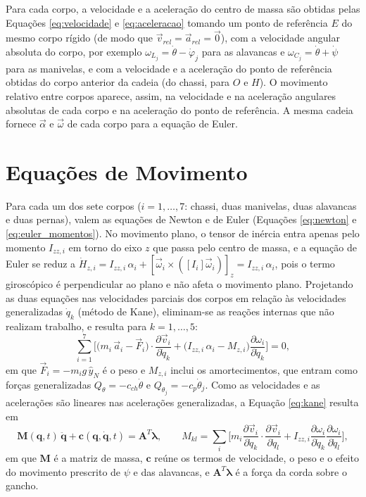 Para cada corpo, a velocidade e a aceleração do centro de massa são obtidas pelas Equações \ref{eq:velocidade} e \ref{eq:aceleracao} tomando um ponto de referência $E$ do mesmo corpo rígido (de modo que $\vec v_{rel}=\vec a_{rel}=\vec 0$), com a velocidade angular absoluta do corpo, por exemplo $\omega_{L_j}=\dot\theta-\dot\varphi_j$ para as alavancas e $\omega_{C_j}=\dot\theta+\dot\psi$ para as manivelas, e com a velocidade e a aceleração do ponto de referência obtidas do corpo anterior da cadeia (do chassi, para $O$ e $H$). O movimento relativo entre corpos aparece, assim, na velocidade e na aceleração angulares absolutas de cada corpo e na aceleração do ponto de referência. A mesma cadeia fornece $\vec\alpha$ e $\vec\omega$ de cada corpo para a equação de Euler.

\section{Equações de Movimento}
\label{sec:eqmov}

Para cada um dos sete corpos ($i=1,\dots,7$: chassi, duas manivelas, duas alavancas e duas pernas), valem as equações de Newton e de Euler (Equações \ref{eq:newton} e \ref{eq:euler_momentos}). No movimento plano, o tensor de inércia entra apenas pelo momento $I_{zz,i}$ em torno do eixo $z$ que passa pelo centro de massa, e a equação de Euler se reduz a $\dot{H}_{z,i}=I_{zz,i}\,\alpha_{i}+\left[\vec\omega_i\times(\left[I_i\right]\vec\omega_i)\right]_z = I_{zz,i}\,\alpha_i$, pois o termo giroscópico é perpendicular ao plano e não afeta o movimento plano. Projetando as duas equações nas velocidades parciais dos corpos em relação às velocidades generalizadas $\dot q_k$ (método de Kane), eliminam-se as reações internas que não realizam trabalho, e resulta para $k=1,\dots,5$:
\begin{equation}
  \sum_{i=1}^{7}\Big[\big(m_i\,\vec a_i-\vec F_i\big)\cdot\frac{\partial\vec v_i}{\partial\dot q_k}
  +\big(I_{zz,i}\,\alpha_i-M_{z,i}\big)\frac{\partial\omega_i}{\partial\dot q_k}\Big]=0,
  \label{eq:kane}
\end{equation}
em que $\vec F_i = -m_i g\,\hat y_N$ é o peso e $M_{z,i}$ inclui os amortecimentos, que entram como forças generalizadas $Q_\theta=-c_{ch}\dot\theta$ e $Q_{\theta_j}=-c_{p}\dot\theta_j$. Como as velocidades e as acelerações são lineares nas acelerações generalizadas, a Equação \ref{eq:kane} resulta em
\begin{equation}
  \mathbf{M}(\mathbf{q},t)\,\ddot{\mathbf{q}} + \mathbf{c}(\mathbf{q},\dot{\mathbf{q}},t) = \mathbf{A}^{T}\boldsymbol{\lambda},
  \qquad
  M_{kl}=\sum_i\Big[m_i\frac{\partial\vec v_i}{\partial\dot q_k}\cdot\frac{\partial\vec v_i}{\partial\dot q_l}+I_{zz,i}\frac{\partial\omega_i}{\partial\dot q_k}\frac{\partial\omega_i}{\partial\dot q_l}\Big],
  \label{eq:Mqdd}
\end{equation}
em que $\mathbf{M}$ é a matriz de massa, $\mathbf{c}$ reúne os termos de velocidade, o peso e o efeito do movimento prescrito de $\psi$ e das alavancas, e $\mathbf{A}^T\boldsymbol{\lambda}$ é a força da corda sobre o gancho.

